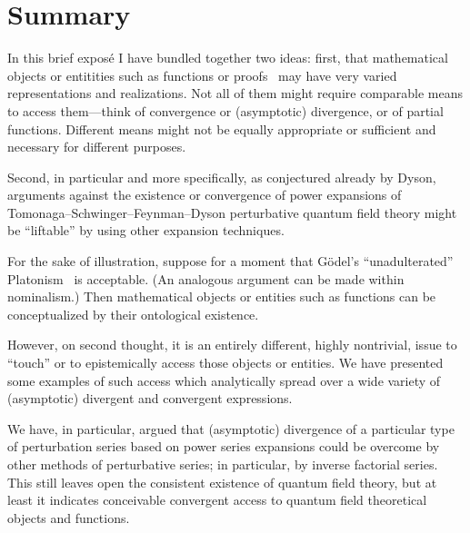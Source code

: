 \documentclass[axioms,article,accept,oneauthor,pdftex]{Definitions/mdpi}
\begin{document}
\section{Summary}

In this brief expos\'e I have bundled together two ideas:
first, that mathematical objects or entitities such as functions or proofs~\cite{ziegler-aigner} may have very varied representations and realizations.
Not all of them might require comparable means to access them---think of convergence or (asymptotic) divergence, or of partial functions.
Different means might not be equally appropriate or sufficient and necessary for different purposes.

Second, in particular and more specifically, as conjectured already by Dyson,
arguments against the existence or convergence of power expansions of Tomonaga--Schwinger--Feynman--Dyson perturbative quantum field theory
might be ``liftable'' by using other expansion techniques.

For the sake of illustration, suppose for a moment that G\"odel's ``unadulterated'' Platonism~\cite{kreisel-80,Parsons1995} is acceptable.
(An analogous argument can be made within nominalism.)
Then mathematical objects or entities such as functions can be conceptualized by their ontological existence.

However,
on second thought, it is an entirely different, highly nontrivial, issue to ``touch'' or to epistemically access those objects or entities.
We have presented some examples of such access which analytically spread over a wide variety of
(asymptotic) divergent and convergent expressions.

We have, in particular, argued that (asymptotic) divergence
of a particular type of perturbation series based on power series expansions
could be overcome by other methods of perturbative series; in particular,
by inverse factorial series.
This still leaves open the consistent existence of quantum field theory,
but at least it indicates conceivable convergent access to quantum field theoretical objects and functions.





\end{document}
